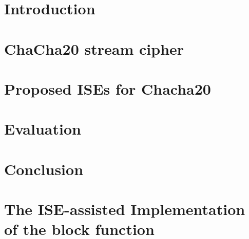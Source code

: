 \documentclass[sigconf]{acmart}
\begin{document}
%



\section{Introduction}
\label{sec:intro}


\section{ChaCha20 stream cipher}
\label{sec:bg}


\section{Proposed ISEs for Chacha20}
\label{sec:ise}


\section{Evaluation}
\label{sec:res}


\section{Conclusion}
\label{sec:outro}




%



\appendix

\newpage
\section{The ISE-assisted Implementation of the block function}
\label{appx:ISE-assisted Implementation}
\lstset{style=mystyle}

\end{document}
